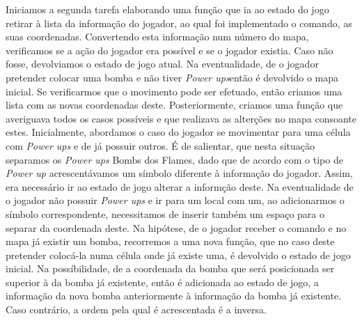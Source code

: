 \documentclass[a4paper]{article}
\begin{document}
Iniciamos a segunda tarefa elaborando uma função que ia ao estado do jogo retirar à lista da informação do jogador, ao qual foi implementado o comando, as suas coordenadas. Convertendo esta informação num número do mapa, verificamos se a ação do jogador era possível e se o jogador existia. Caso não fosse, devolviamos o estado de jogo atual. Na eventualidade, de o jogador pretender colocar uma bomba e não tiver \textit{Power ups}então é devolvido o mapa inicial. Se verificarmos que o movimento pode ser efetuado, então criamos uma lista com as novas coordenadas deste. Posteriormente, criamos uma função que averiguava todos os casos possíveis e que realizava as alterções no mapa consoante estes. Inicialmente, abordamos o caso do jogador se movimentar para uma célula com  \textit{Power ups} e de já possuir outros. É de salientar, que nesta situação separamos os \textit{Power ups} Bombs dos Flames, dado que de acordo com o tipo de \textit{Power up} acrescentávamos um símbolo diferente à informação do jogador. Assim, era necessário ir ao estado de jogo alterar a informção deste. Na eventualidade de o jogador não possuir \textit{Power ups}  e ir para um local com um, ao adicionarmos o símbolo correspondente, necessitamos de inserir também um espaço para o separar da coordenada deste. Na hipótese, de o jogador receber o comando  e no mapa já existir um bomba, recorremos a uma nova função, que no caso deste pretender colocá-la numa célula onde já existe uma, é devolvido o estado de jogo inicial. Na possíbilidade, de a coordenada da bomba que será posicionada ser superior à da bomba já existente, então é adicionada ao estado de jogo, a informação da nova bomba anteriormente à informação da bomba já existente. Caso contrário, a ordem pela qual é acrescentada é a inversa.
\end{document}
